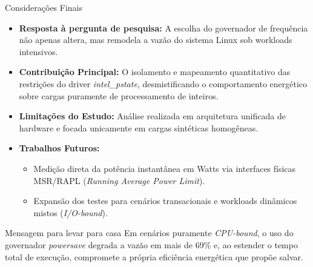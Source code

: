 \documentclass[aspectratio=169,10pt]{beamer}
\begin{document}
\begin{frame}{Considerações Finais}
    \begin{itemize}
        \item \textbf{Resposta à pergunta de pesquisa:} A escolha do governador de frequência não apenas altera, mas remodela a vazão do sistema Linux sob workloads intensivos.
        \item \textbf{Contribuição Principal:} O isolamento e mapeamento quantitativo das restrições do driver \textit{intel\_pstate}, desmistificando o comportamento energético sobre cargas puramente de processamento de inteiros.
        \item \textbf{Limitações do Estudo:} Análise realizada em arquitetura unificada de hardware e focada unicamente em cargas sintéticas homogêneas.
        \item \textbf{Trabalhos Futuros:}
        \begin{itemize}
            \item Medição direta da potência instantânea em Watts via interfaces físicas MSR/RAPL (\textit{Running Average Power Limit}).
            \item Expansão dos testes para cenários transacionais e workloads dinâmicos mistos (\textit{I/O-bound}).
        \end{itemize}
    \end{itemize}

    \begin{block}{Mensagem para levar para casa}
        Em cenários puramente \textit{CPU-bound}, o uso do governador \textit{powersave} degrada a vazão em mais de 69\% e, ao estender o tempo total de execução, compromete a própria eficiência energética que propõe salvar.
    \end{block}
\end{frame}
\end{document}
